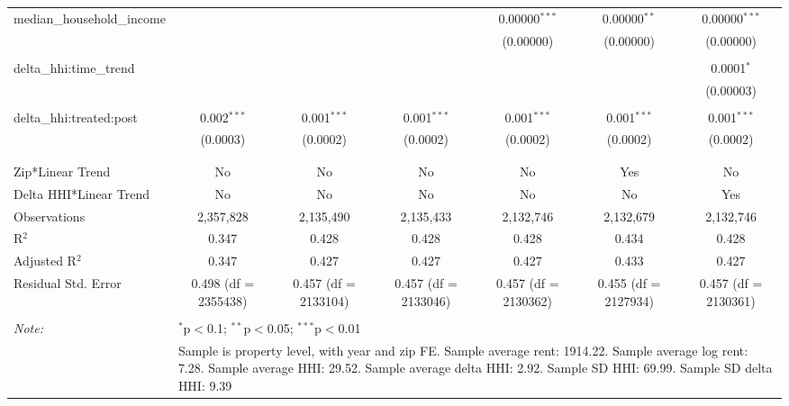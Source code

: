 \begin{table}[H]
{\begin{tabular}{@{\extracolsep{5pt}}lcccccc}
  median\_household\_income &  &  &  & 0.00000$^{***}$ & 0.00000$^{**}$ & 0.00000$^{***}$ \\  

   &  &  &  & (0.00000) & (0.00000) & (0.00000) \\  

   & & & & & & \\  

  delta\_hhi:time\_trend &  &  &  &  &  & 0.0001$^{*}$ \\  

   &  &  &  &  &  & (0.00003) \\  

   & & & & & & \\  

  delta\_hhi:treated:post & 0.002$^{***}$ & 0.001$^{***}$ & 0.001$^{***}$ & 0.001$^{***}$ & 0.001$^{***}$ & 0.001$^{***}$ \\  

   & (0.0003) & (0.0002) & (0.0002) & (0.0002) & (0.0002) & (0.0002) \\  

   & & & & & & \\  

 \hline \\[-1.8ex]  

 Zip*Linear Trend & No & No & No & No & Yes & No \\  

 Delta HHI*Linear Trend & No & No & No & No & No & Yes \\  

 Observations & 2,357,828 & 2,135,490 & 2,135,433 & 2,132,746 & 2,132,679 & 2,132,746 \\  

 R$^{2}$ & 0.347 & 0.428 & 0.428 & 0.428 & 0.434 & 0.428 \\  

 Adjusted R$^{2}$ & 0.347 & 0.427 & 0.427 & 0.427 & 0.433 & 0.427 \\  

 Residual Std. Error & 0.498 (df = 2355438) & 0.457 (df = 2133104) & 0.457 (df = 2133046) & 0.457 (df = 2130362) & 0.455 (df = 2127934) & 0.457 (df = 2130361) \\  

 \hline  

 \hline \\[-1.8ex]  

 \textit{Note:}  & \multicolumn{6}{l}{$^{*}$p$<$0.1; $^{**}$p$<$0.05; $^{***}$p$<$0.01} \\  

  & \multicolumn{6}{l}{Sample is property level, with year and zip FE. Sample average rent: 1914.22. Sample average log rent: 7.28. Sample average HHI: 29.52. Sample average delta HHI: 2.92. Sample SD HHI: 69.99. Sample SD delta HHI: 9.39} \\  

 \end{tabular}}  

 \end{table}  


